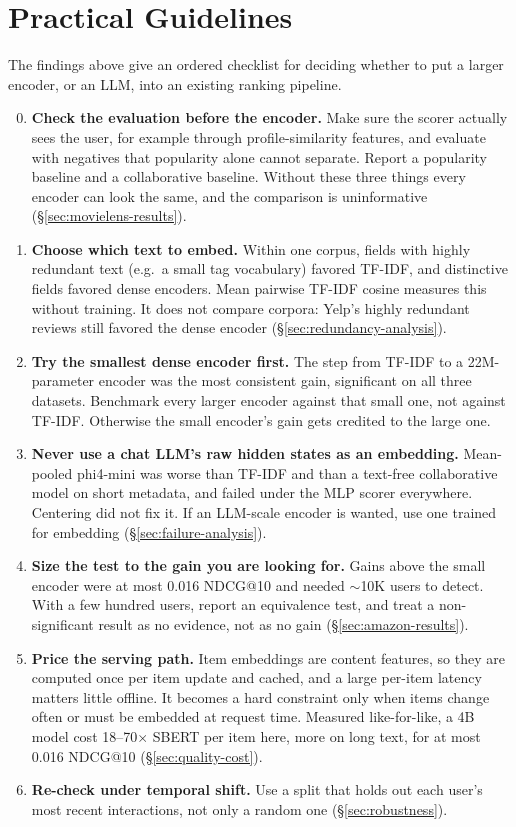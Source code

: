\section{Practical Guidelines}
\label{sec:practical-guidelines}

The findings above give an ordered checklist for deciding whether to
put a larger encoder, or an LLM, into an existing ranking pipeline.

\begin{enumerate}
  \setcounter{enumi}{-1}
  \item \textbf{Check the evaluation before the encoder.} Make sure the
    scorer actually sees the user, for example through
    profile-similarity features, and evaluate with negatives that
    popularity alone cannot separate. Report a popularity baseline and a
    collaborative baseline. Without these three things every encoder
    can look the same, and the comparison is uninformative
    (\S\ref{sec:movielens-results}).
  \item \textbf{Choose which text to embed.} Within one corpus,
    fields with highly redundant text (e.g.\ a small tag vocabulary)
    favored TF-IDF, and distinctive fields favored dense encoders.
    Mean pairwise TF-IDF cosine measures this without training. It does
    not compare corpora: Yelp's highly redundant reviews still favored
    the dense encoder (\S\ref{sec:redundancy-analysis}).
  \item \textbf{Try the smallest dense encoder first.} The step from
    TF-IDF to a 22M-parameter encoder was the most consistent gain,
    significant on all three datasets. Benchmark every larger encoder against that small one,
    not against TF-IDF. Otherwise the small encoder's gain gets credited
    to the large one.
  \item \textbf{Never use a chat LLM's raw hidden states as an
    embedding.} Mean-pooled phi4-mini was worse than TF-IDF and than a
    text-free collaborative model on short metadata, and failed under
    the MLP scorer everywhere. Centering did not fix it. If an LLM-scale
    encoder is wanted, use one trained for embedding
    (\S\ref{sec:failure-analysis}).
  \item \textbf{Size the test to the gain you are looking for.} Gains
    above the small encoder were at most 0.016 NDCG@10 and needed
    $\sim$10K users to detect. With a few hundred users, report an
    equivalence test, and treat a non-significant result as no
    evidence, not as no gain (\S\ref{sec:amazon-results}).
  \item \textbf{Price the serving path.} Item embeddings are content
    features, so they are computed once per item update and cached, and
    a large per-item latency matters little offline. It becomes a hard
    constraint only when items change often or must be embedded at
    request time. Measured like-for-like, a 4B model cost 18--70$\times$
    SBERT per item here, more on long text, for at most 0.016 NDCG@10
    (\S\ref{sec:quality-cost}).
  \item \textbf{Re-check under temporal shift.} Use a split that holds
    out each user's most recent interactions, not only a random one
    (\S\ref{sec:robustness}).
\end{enumerate}
